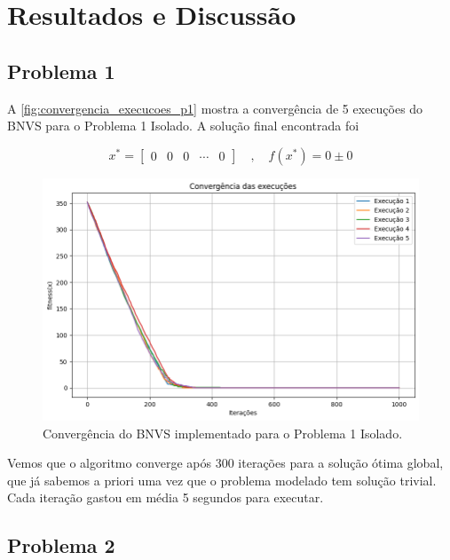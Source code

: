 \documentclass[
	12pt,				%
	oneside,			%
	a4paper,			%
	chapter=TITLE,
	sumario=tradicional,
	english,			%
	brazil				%
]{abntex2}
\begin{document}
\chapter{Resultados e Discussão}\label{cap:resultados} 


\section{Problema 1}

A \autoref{fig:convergencia_execucoes_p1} mostra a convergência de 5 execuções 
do BNVS para o Problema 1 Isolado. A solução final encontrada foi 


\[  x^* = \begin{bmatrix} 0 & 0 & 0 & \cdots & 0 \end{bmatrix} \quad , \quad f\left(x^*\right) = 0 \pm 0 \]


\begin{figure}[h!]
	\caption{\label{fig:convergencia_execucoes_p1}Convergência do BNVS implementado para o Problema 1 Isolado.}
	\begin{center}
    \includegraphics[width=\textwidth,trim=1 1 1 1,clip]{convergencia_execucoes_p1.png}
	\end{center}
\end{figure}

Vemos que o algoritmo converge após 300 iterações para a solução 
ótima global, que já sabemos a priori uma vez que o problema modelado 
tem solução trivial. Cada iteração gastou em média 5 segundos para executar.

\section{Problema 2}
\end{document}
